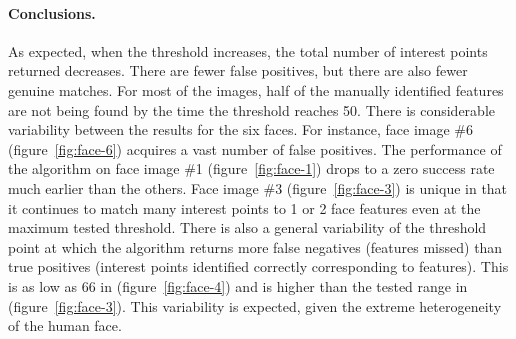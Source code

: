 \paragraph{Conclusions.}
As expected, when the threshold increases, the total number of interest points returned decreases. There are fewer false positives, but there are also fewer genuine matches. For most of the images, half of the manually identified features are not being found by the time the threshold reaches 50. There is considerable variability between the results for the six faces. For instance, face image \#6 (figure~\ref{fig:face-6}) acquires a vast number of false positives. The performance of the algorithm on face image \#1 (figure~\ref{fig:face-1}) drops to a zero success rate much earlier than the others. Face image \#3 (figure~\ref{fig:face-3}) is unique in that it continues to match many interest points to 1 or 2 face features even at the maximum tested threshold. There is also a 
general variability of the threshold point at which the algorithm returns more false negatives (features missed) than true positives (interest points identified correctly corresponding to features). This is as low as 66 in (figure~\ref{fig:face-4}) and is higher than the tested range in (figure~\ref{fig:face-3}). This variability is expected, given the extreme heterogeneity of the human face.
